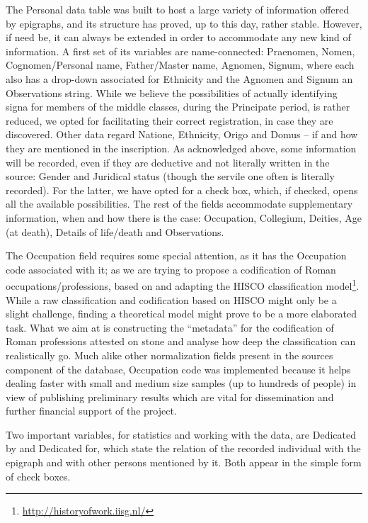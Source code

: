 \documentclass[amsthm,ebook]{saparticle}
\begin{document}
The Personal data table was built to host a large variety of information offered by epigraphs, and its structure has
proved, up to this day, rather stable. However, if need be, it can always be extended in order to accommodate any new
kind of information. A first set of its variables are name-connected: Praenomen, Nomen, Cognomen/Personal name,
Father/Master name, Agnomen, Signum, where each also has a drop-down associated for Ethnicity and the Agnomen and
Signum an Observations string. While we believe the possibilities of actually identifying signa for members of the
middle classes, during the Principate period, is rather reduced, we opted for facilitating their correct registration,
in case they are discovered. Other data regard Natione, Ethnicity, Origo and Domus – if and how they are mentioned in
the inscription. As acknowledged above, some information will be recorded, even if they are deductive and not literally
written in the source: Gender and Juridical status (though the servile one often is literally recorded). For the
latter, we have opted for a check box, which, if checked, opens all the available possibilities. The rest of the fields
accommodate supplementary information, when and how there is the case: Occupation, Collegium, Deities, Age (at death),
Details of life/death and Observations. 

The Occupation field requires some special attention, as it has the Occupation code associated with it; as we are trying
to propose a codification of Roman occupations/professions, based on and adapting the HISCO classification
model\footnote{\url{http://historyofwork.iisg.nl/} }. While a raw classification and codification based on HISCO might only
be a slight challenge, finding a theoretical model might prove to be a more elaborated task. What we aim at is
constructing the “metadata” for the codification of Roman professions attested on stone and analyse how deep the
classification can realistically go. Much alike other normalization fields present in the sources component of the
database, Occupation code was implemented because it helps dealing faster with small and medium size samples (up to
hundreds of people) in view of publishing preliminary results which are vital for dissemination and further financial
support of the project. 

Two important variables, for statistics and working with the data, are Dedicated by and Dedicated for, which state the
relation of the recorded individual with the epigraph and with other persons mentioned by it. Both appear in the simple
form of check boxes. 
\end{document}
